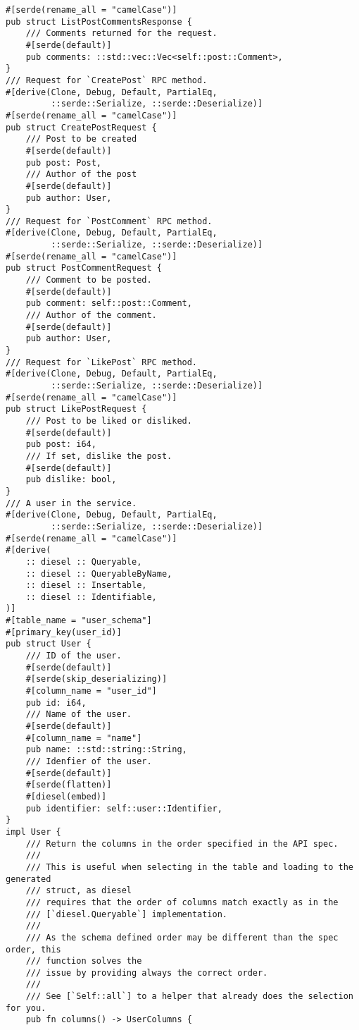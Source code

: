 \begin{verbatim}
#[serde(rename_all = "camelCase")]
pub struct ListPostCommentsResponse {
    /// Comments returned for the request.
    #[serde(default)]
    pub comments: ::std::vec::Vec<self::post::Comment>,
}
/// Request for `CreatePost` RPC method.
#[derive(Clone, Debug, Default, PartialEq,
         ::serde::Serialize, ::serde::Deserialize)]
#[serde(rename_all = "camelCase")]
pub struct CreatePostRequest {
    /// Post to be created
    #[serde(default)]
    pub post: Post,
    /// Author of the post
    #[serde(default)]
    pub author: User,
}
/// Request for `PostComment` RPC method.
#[derive(Clone, Debug, Default, PartialEq,
         ::serde::Serialize, ::serde::Deserialize)]
#[serde(rename_all = "camelCase")]
pub struct PostCommentRequest {
    /// Comment to be posted.
    #[serde(default)]
    pub comment: self::post::Comment,
    /// Author of the comment.
    #[serde(default)]
    pub author: User,
}
/// Request for `LikePost` RPC method.
#[derive(Clone, Debug, Default, PartialEq,
         ::serde::Serialize, ::serde::Deserialize)]
#[serde(rename_all = "camelCase")]
pub struct LikePostRequest {
    /// Post to be liked or disliked.
    #[serde(default)]
    pub post: i64,
    /// If set, dislike the post.
    #[serde(default)]
    pub dislike: bool,
}
/// A user in the service.
#[derive(Clone, Debug, Default, PartialEq,
         ::serde::Serialize, ::serde::Deserialize)]
#[serde(rename_all = "camelCase")]
#[derive(
    :: diesel :: Queryable,
    :: diesel :: QueryableByName,
    :: diesel :: Insertable,
    :: diesel :: Identifiable,
)]
#[table_name = "user_schema"]
#[primary_key(user_id)]
pub struct User {
    /// ID of the user.
    #[serde(default)]
    #[serde(skip_deserializing)]
    #[column_name = "user_id"]
    pub id: i64,
    /// Name of the user.
    #[serde(default)]
    #[column_name = "name"]
    pub name: ::std::string::String,
    /// Idenfier of the user.
    #[serde(default)]
    #[serde(flatten)]
    #[diesel(embed)]
    pub identifier: self::user::Identifier,
}
impl User {
    /// Return the columns in the order specified in the API spec.
    ///
    /// This is useful when selecting in the table and loading to the generated
    /// struct, as diesel
    /// requires that the order of columns match exactly as in the
    /// [`diesel.Queryable`] implementation.
    ///
    /// As the schema defined order may be different than the spec order, this
    /// function solves the
    /// issue by providing always the correct order.
    ///
    /// See [`Self::all`] to a helper that already does the selection for you.
    pub fn columns() -> UserColumns {

\end{verbatim}
